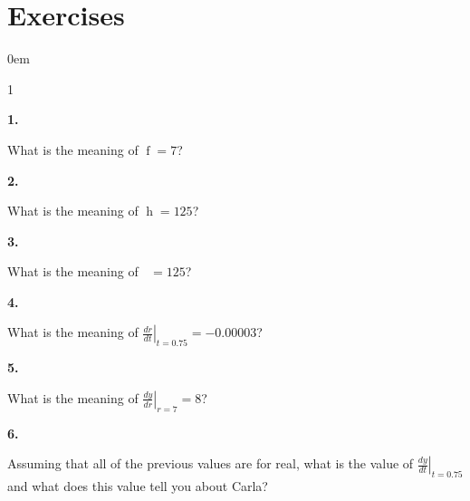 \documentclass[12pt,]{book}
\theoremstyle{plain}
\theoremstyle{definition}
\numberwithin{equation}{section}
\newenvironment{exercisegroup}%
{\medskip\noindent}%
{\par\bigskip}%
\newlength{\exercisegroupindent}%
\newlength{\exercisegroupitemwidth}%
\newenvironment{exercisegrouplist}%
{\vspace{-\partopsep}%
\begin{adjustwidth}{\exercisegroupindent}{0em}}%
{\end{adjustwidth}%
\vspace{-\partopsep}%
\vspace{\baselineskip}}%
\newenvironment{exercisegroupbycol}[1]%
{\begin{exercisegrouplist}%
\vspace{-\multicolsep}%
\begin{multicols}{#1}%
\setlength{\parindent}{0em}%
\setlength{\exercisegroupitemwidth}{\linewidth}}%
{\end{multicols}%
\vspace{-\multicolsep}%
\end{exercisegrouplist}}%
\newenvironment{exercisegroupitem}[1]%
{\begin{minipage}[t]{\exercisegroupitemwidth}
\vspace{0pt}%
{\bfseries#1}%
\rule{0pt}{\baselineskip}}{\strut%
\end{minipage}%
\hspace{\columnsep}}%
\providecommand\phantomsection{}
\newcommand{\fe}[2]{\mathop{{#1}{\left(#2\right)}}}
\newcommand{\lzoa}[3]{\left.{\frac{d#1}{d#2}}\right|_{#3}}
\begin{document}
\section*{Exercises}\label{exercises-41}

\begin{exercisegroup}%
\begin{exercisegroupbycol}{1}%
\begin{exercisegroupitem}{1. }\phantomsection\hypertarget{exercise-308}{\null}
What is the meaning of \(\fe{f}{0.75}=7\)?%
\end{exercisegroupitem}%
\par%
\begin{exercisegroupitem}{2. }\phantomsection\hypertarget{exercise-309}{\null}
What is the meaning of \(\fe{h}{7}=125\)?%
\end{exercisegroupitem}%
\par%
\begin{exercisegroupitem}{3. }\phantomsection\hypertarget{exercise-310}{\null}
What is the meaning of \(\fe{\left(h\circ f\right)}{0.75}=125\)?%
\end{exercisegroupitem}%
\par%
\begin{exercisegroupitem}{4. }\phantomsection\hypertarget{exercise-311}{\null}
What is the meaning of \(\lzoa{r}{t}{t=0.75}=-0.00003\)?%
\end{exercisegroupitem}%
\par%
\begin{exercisegroupitem}{5. }\phantomsection\hypertarget{exercise-312}{\null}
What is the meaning of \(\lzoa{y}{r}{r=7}=8\)?%
\end{exercisegroupitem}%
\par%
\begin{exercisegroupitem}{6. }\phantomsection\hypertarget{exercise-313}{\null}
Assuming that all of the previous values are for real, what is the value of \(\lzoa{y}{t}{t=0.75}\) and what does this value tell you about Carla?%
\end{exercisegroupitem}%
\par%
\end{exercisegroupbycol}%
\end{exercisegroup}%
\end{document}
